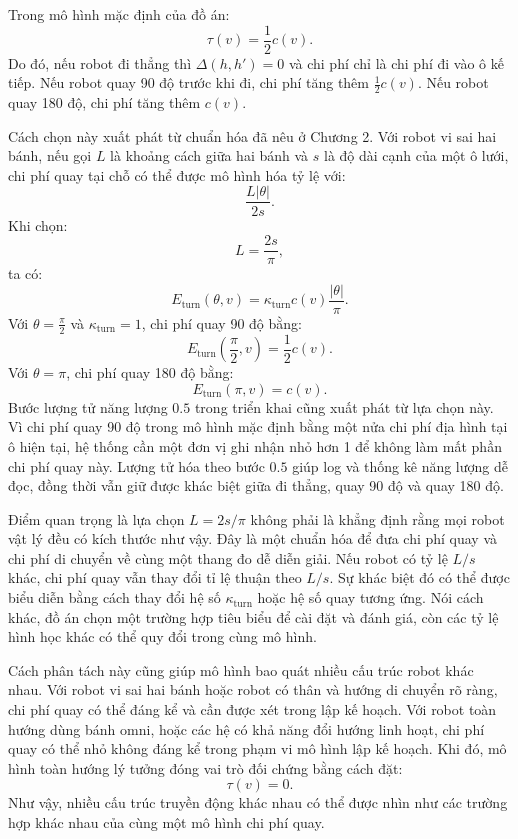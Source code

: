 \documentclass[../DoAn.tex]{subfiles}
\begin{document}
Trong mô hình mặc định của đồ án:
\begin{equation}
\tau(v)=\frac{1}{2}c(v).
\end{equation}
Do đó, nếu robot đi thẳng thì $\Delta(h,h')=0$ và chi phí chỉ là chi phí đi vào ô kế tiếp. Nếu robot quay 90 độ trước khi đi, chi phí tăng thêm $\frac{1}{2}c(v)$. Nếu robot quay 180 độ, chi phí tăng thêm $c(v)$.

Cách chọn này xuất phát từ chuẩn hóa đã nêu ở Chương 2. Với robot vi sai hai bánh, nếu gọi $L$ là khoảng cách giữa hai bánh và $s$ là độ dài cạnh của một ô lưới, chi phí quay tại chỗ có thể được mô hình hóa tỷ lệ với:
\begin{equation}
\frac{L|\theta|}{2s}.
\end{equation}
Khi chọn:
\begin{equation}
L=\frac{2s}{\pi},
\end{equation}
ta có:
\begin{equation}
E_{\text{turn}}(\theta,v)=\kappa_{\text{turn}}c(v)\frac{|\theta|}{\pi}.
\end{equation}
Với $\theta=\frac{\pi}{2}$ và $\kappa_{\text{turn}}=1$, chi phí quay 90 độ bằng:
\begin{equation}
E_{\text{turn}}\left(\frac{\pi}{2},v\right)=\frac{1}{2}c(v).
\end{equation}
Với $\theta=\pi$, chi phí quay 180 độ bằng:
\begin{equation}
E_{\text{turn}}(\pi,v)=c(v).
\end{equation}
Bước lượng tử năng lượng $0.5$ trong triển khai cũng xuất phát từ lựa chọn này. Vì chi phí quay 90 độ trong mô hình mặc định bằng một nửa chi phí địa hình tại ô hiện tại, hệ thống cần một đơn vị ghi nhận nhỏ hơn 1 để không làm mất phần chi phí quay này. Lượng tử hóa theo bước $0.5$ giúp log và thống kê năng lượng dễ đọc, đồng thời vẫn giữ được khác biệt giữa đi thẳng, quay 90 độ và quay 180 độ.

Điểm quan trọng là lựa chọn $L=2s/\pi$ không phải là khẳng định rằng mọi robot vật lý đều có kích thước như vậy. Đây là một chuẩn hóa để đưa chi phí quay và chi phí di chuyển về cùng một thang đo dễ diễn giải. Nếu robot có tỷ lệ $L/s$ khác, chi phí quay vẫn thay đổi tỉ lệ thuận theo $L/s$. Sự khác biệt đó có thể được biểu diễn bằng cách thay đổi hệ số $\kappa_{\text{turn}}$ hoặc hệ số quay tương ứng. Nói cách khác, đồ án chọn một trường hợp tiêu biểu để cài đặt và đánh giá, còn các tỷ lệ hình học khác có thể quy đổi trong cùng mô hình.

Cách phân tách này cũng giúp mô hình bao quát nhiều cấu trúc robot khác nhau. Với robot vi sai hai bánh hoặc robot có thân và hướng di chuyển rõ ràng, chi phí quay có thể đáng kể và cần được xét trong lập kế hoạch. Với robot toàn hướng dùng bánh omni, hoặc các hệ có khả năng đổi hướng linh hoạt, chi phí quay có thể nhỏ không đáng kể trong phạm vi mô hình lập kế hoạch. Khi đó, mô hình toàn hướng lý tưởng đóng vai trò đối chứng bằng cách đặt:
\begin{equation}
\tau(v)=0.
\end{equation}
Như vậy, nhiều cấu trúc truyền động khác nhau có thể được nhìn như các trường hợp khác nhau của cùng một mô hình chi phí quay.
\end{document}
